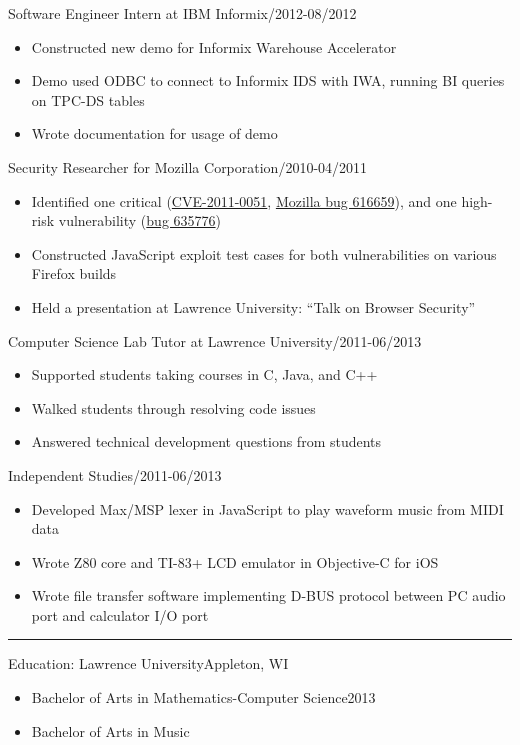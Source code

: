 \documentclass[letterpaper, 11pt]{article}
\newcommand{\superbold}[1]{{\fontseries{b}\selectfont#1}}
\newcommand{\dottitle}[2]{\flushleft\normalsize\superbold{#1\dotfill#2}}
\newcommand{\jobStart}[2]{
    \dottitle{#1}{#2}\vspace{-0.05cm}
    \begin{itemize}
}
\newcommand{\jobEnd}{
    \end{itemize}\vspace{0.05cm}
}
\begin{document}
\jobStart{Software Engineer Intern at IBM Informix}{06/2012-08/2012}
    \item Constructed new demo for Informix Warehouse Accelerator
    \item Demo used ODBC to connect to Informix IDS with IWA, running BI queries on TPC-DS tables
    \item Wrote documentation for usage of demo
\jobEnd

\jobStart{Security Researcher for Mozilla Corporation}{09/2010-04/2011}
    \item Identified one critical (\href{https://cve.mitre.org/cgi-bin/cvename.cgi?name=CVE-2011-0051}{CVE-2011-0051}, \href{https://www.mozilla.org/en-US/security/advisories/mfsa2011-02}{Mozilla bug 616659}), and one high-risk vulnerability (\href{https://bugzilla.mozilla.org/show_bug.cgi?id=635776}{bug 635776})
    \item Constructed JavaScript exploit test cases for both vulnerabilities on various Firefox builds
    \item Held a presentation at Lawrence University: “Talk on Browser Security”
\jobEnd

\jobStart{Computer Science Lab Tutor at Lawrence University}{09/2011-06/2013}
    \item Supported students taking courses in C, Java, and C++
    \item Walked students through resolving code issues
    \item Answered technical development questions from students
\jobEnd

\jobStart{Independent Studies}{09/2011-06/2013}
    \item Developed Max/MSP lexer in JavaScript to play waveform music from MIDI data
    \item Wrote Z80 core and TI-83+ LCD emulator in Objective-C for iOS
    \item Wrote file transfer software implementing D-BUS protocol between PC audio port and calculator I/O port
\jobEnd

\hrule\vspace{0.3cm}

{
    \dottitle{Education: Lawrence University}{Appleton, WI}\vspace{-0.05cm}
    \begin{itemize}[label={}]
        \item Bachelor of Arts in Mathematics-Computer Science\hfill 2013
        \item Bachelor of Arts in Music
    \end{itemize}
}
\end{document}
